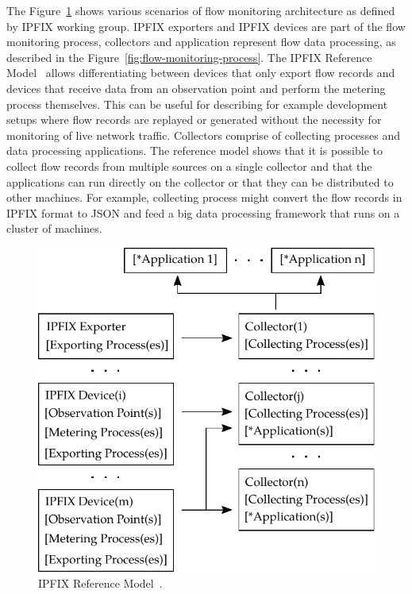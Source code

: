 The Figure~\ref{fig:ipfix_reference_model} shows various scenarios of flow monitoring architecture as defined by IPFIX working group. IPFIX exporters and IPFIX devices are part of the flow monitoring process, collectors and application represent flow data processing, as described in the Figure~\ref{fig:flow-monitoring-process}. The IPFIX Reference Model~\cite{rfc5470} allows differentiating between devices that only export flow records and devices that receive data from an observation point and perform the metering process themselves. This can be useful for describing for example development setups where flow records are replayed or generated without the necessity for monitoring of live network traffic. Collectors comprise of collecting processes and data processing applications. The reference model shows that it is possible to collect flow records from multiple sources on a single collector and that the applications can run directly on the collector or that they can be distributed to other machines. For example, collecting process might convert the flow records in IPFIX format to JSON and feed a big data processing framework that runs on a cluster of machines.

\begin{figure}[t!]
  \begin{center}
    \includegraphics{figures/c02/ipfix-reference-model}
  \end{center}
  \caption{IPFIX Reference Model~\cite{rfc5470}.}
  \label{fig:ipfix_reference_model}
\end{figure}

